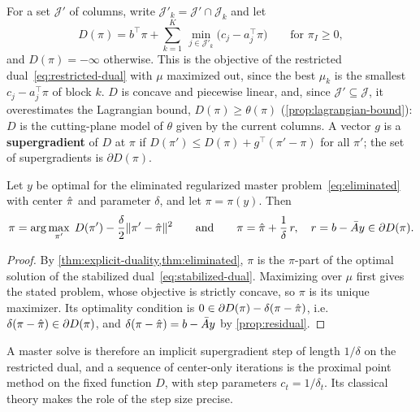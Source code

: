 For a set $\mathcal{J}'$ of columns, write $\mathcal{J}'_k = \mathcal{J}'\cap\mathcal{J}_k$ and
let
\[
D(\pi) = b^\top\pi + \sum_{k=1}^{K}\,\min_{j\in\mathcal{J}'_k}\bigl(c_j - a_j^\top\pi\bigr)
\qquad\text{for } \pi_I\ge0,
\]
and $D(\pi) = -\infty$ otherwise. This is the objective of the restricted
dual~\eqref{eq:restricted-dual} with $\mu$ maximized out, since the best $\mu_k$ is the
smallest $c_j - a_j^\top\pi$ of block $k$. $D$ is concave and piecewise linear, and, since
$\mathcal{J}'\subseteq\mathcal{J}$, it overestimates the Lagrangian bound,
$D(\pi)\ge\theta(\pi)$ (\cref{prop:lagrangian-bound}): $D$ is the cutting-plane model of
$\theta$ given by the current columns. A vector $g$ is a \textbf{supergradient} of $D$ at $\pi$
if $D(\pi')\le D(\pi) + g^\top(\pi'-\pi)$ for all $\pi'$; the set of supergradients is
$\partial D(\pi)$.

\begin{prop} \label{prop:proximal-step}
Let $y$ be optimal for the eliminated regularized master problem~\eqref{eq:eliminated} with
center $\hat{\pi}$ and parameter $\delta$, and let $\pi = \pi(y)$. Then
\[
\pi = \arg\max_{\pi'}\; D(\pi') - \frac{\delta}{2}\lVert\pi' - \hat{\pi}\rVert^2
\qquad\text{and}\qquad
\pi = \hat{\pi} + \frac{1}{\delta}\,r, \quad r = b - \bar{A} y\in\partial D(\pi).
\]
\end{prop}

\begin{proof}
By \cref{thm:explicit-duality,thm:eliminated}, $\pi$ is the $\pi$-part of the optimal solution
of the stabilized dual~\eqref{eq:stabilized-dual}. Maximizing over $\mu$ first gives the
stated problem, whose objective is strictly concave, so $\pi$ is its unique maximizer. Its
optimality condition is $0\in\partial D(\pi) - \delta(\pi - \hat{\pi})$, i.e.\
$\delta(\pi-\hat{\pi})\in\partial D(\pi)$, and $\delta(\pi - \hat{\pi}) = b - \bar{A} y$ by
\cref{prop:residual}.
\end{proof}

A master solve is therefore an implicit supergradient step of length $1/\delta$ on the
restricted dual, and a sequence of center-only iterations is the proximal point method
\cite{rockafellar1976monotone} on the fixed function $D$, with step parameters
$c_t = 1/\delta_t$. Its classical theory makes the role of the step size precise.

